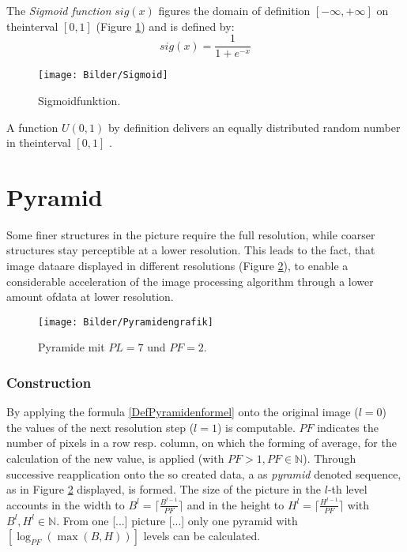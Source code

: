   \noindent The \textit{Sigmoid function} $sig(x)$ figures the domain of definition $[-\infty,+\infty]$ on the\linebreak interval $[0, 1]$ (Figure \ref{Sigmoidfunktion}) and is defined by: \cite{Omran2006}
  \begin{equation}\label{DefSigmoid}
    sig(x)=\frac{1}{1+e^{-x}}
  \end{equation}
  \begin{figure}[!b]
    \centering
    \texttt{[image: Bilder/Sigmoid]}
    \caption{Sigmoidfunktion.}
    \label{Sigmoidfunktion}
  \end{figure}

  \noindent A function $U(0,1)$ by definition delivers an equally distributed random number in the\linebreak interval $[0, 1]$ \cite{Omran2006}.

\section{Pyramid}
  Some finer structures in the picture require the full resolution, while coarser structures stay perceptible at a lower resolution. This leads to the fact, that image data\linebreak are displayed in different resolutions (Figure \ref{Pyramidengrafik}), to enable a considerable acceleration of the image processing algorithm through a lower amount of\linebreak data at lower resolution. \cite{Jaehne2002} 
  \begin{figure}[!b]
    \centering
    \texttt{[image: Bilder/Pyramidengrafik]}
    \caption{Pyramide mit $PL=7$ und $PF=2$.}
    \label{Pyramidengrafik}
  \end{figure}

\subsubsection{Construction}
 By applying the formula \ref{DefPyramidenformel} onto the original image ($l=0$) the values of the next resolution step ($l=1$) is computable. $PF$ indicates the number of pixels in a row resp. column, on which the forming of average, for the calculation of the new value, is applied (with $PF>1, PF\in\mathbb{N}$). Through successive reapplication onto the so created data, a as \textit{pyramid} denoted sequence, as in Figure \ref{Pyramidengrafik} displayed, is formed. The size of the picture in the $l$-th level accounts in the width to $B^l = \lceil\frac{B^{l-1}}{PF}\rceil$ and in the height to $H^l = \lceil\frac{H^{l-1}}{PF}\rceil$ with $B^l,H^l\in\mathbb{N}$. \glqq From one [...] picture [...] only one pyramid with $[\log_{PF}{(\max(B,H))}]$ levels can be calculated.\grqq\space\cite{Jaehne2002}
 
